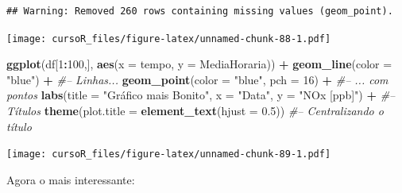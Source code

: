 \documentclass[]{book}
\newenvironment{Shaded}{\begin{snugshade}}{\end{snugshade}}
\newcommand{\KeywordTok}[1]{\textcolor[rgb]{0.13,0.29,0.53}{\textbf{#1}}}
\newcommand{\DataTypeTok}[1]{\textcolor[rgb]{0.13,0.29,0.53}{#1}}
\newcommand{\DecValTok}[1]{\textcolor[rgb]{0.00,0.00,0.81}{#1}}
\newcommand{\FloatTok}[1]{\textcolor[rgb]{0.00,0.00,0.81}{#1}}
\newcommand{\StringTok}[1]{\textcolor[rgb]{0.31,0.60,0.02}{#1}}
\newcommand{\CommentTok}[1]{\textcolor[rgb]{0.56,0.35,0.01}{\textit{#1}}}
\newcommand{\OperatorTok}[1]{\textcolor[rgb]{0.81,0.36,0.00}{\textbf{#1}}}
\newcommand{\NormalTok}[1]{#1}
\theoremstyle{definition}
\theoremstyle{definition}
\theoremstyle{definition}
\theoremstyle{remark}
\begin{document}
\begin{verbatim}
## Warning: Removed 260 rows containing missing values (geom_point).
\end{verbatim}

\texttt{[image: cursoR\_files/figure-latex/unnamed-chunk-88-1.pdf]}

\begin{Shaded}
\begin{Highlighting}[]
\KeywordTok{ggplot}\NormalTok{(df[}\DecValTok{1}\OperatorTok{:}\DecValTok{100}\NormalTok{,], }\KeywordTok{aes}\NormalTok{(}\DataTypeTok{x =}\NormalTok{ tempo, }\DataTypeTok{y =}\NormalTok{ MediaHoraria)) }\OperatorTok{+}\StringTok{ }
\StringTok{  }\KeywordTok{geom_line}\NormalTok{(}\DataTypeTok{color =} \StringTok{"blue"}\NormalTok{) }\OperatorTok{+}\StringTok{ }\CommentTok{#-- Linhas...}
\StringTok{  }\KeywordTok{geom_point}\NormalTok{(}\DataTypeTok{color =} \StringTok{"blue"}\NormalTok{, }\DataTypeTok{pch =} \DecValTok{16}\NormalTok{) }\OperatorTok{+}\StringTok{ }\CommentTok{#-- ... com pontos}
\StringTok{  }\KeywordTok{labs}\NormalTok{(}\DataTypeTok{title =} \StringTok{"Gráfico mais Bonito"}\NormalTok{, }\DataTypeTok{x =} \StringTok{"Data"}\NormalTok{, }\DataTypeTok{y =} \StringTok{"NOx [ppb]"}\NormalTok{) }\OperatorTok{+}\StringTok{ }\CommentTok{#-- Títulos}
\StringTok{  }\KeywordTok{theme}\NormalTok{(}\DataTypeTok{plot.title =} \KeywordTok{element_text}\NormalTok{(}\DataTypeTok{hjust =} \FloatTok{0.5}\NormalTok{)) }\CommentTok{#-- Centralizando o título}
\end{Highlighting}
\end{Shaded}

\texttt{[image: cursoR\_files/figure-latex/unnamed-chunk-89-1.pdf]}

Agora o mais interessante:
\end{document}
